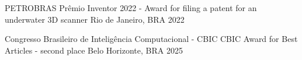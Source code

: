 



\begin{cvhonors}

  \cvhonor
    {PETROBRAS} %
    {Prêmio Inventor 2022 - Award for filing a patent for an underwater 3D scanner} %
    {Rio de Janeiro, BRA} %
    {2022} %

  \cvhonor
    {Congresso Brasileiro de Inteligência Computacional - CBIC} %
    {CBIC Award for Best Articles - second place} %
    {Belo Horizonte, BRA} %
    {2025} %

\end{cvhonors}







